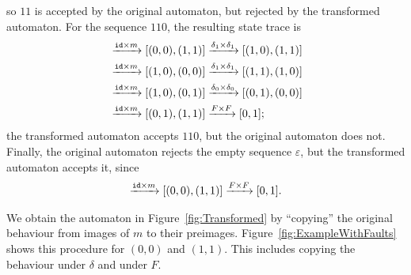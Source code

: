 so $11$ is accepted by the original automaton, but rejected by the transformed automaton. 
For the sequence $110$, the resulting state trace is 
\begin{align*}
    [(0,0),(0,0)]&\xrightarrow{\id\times m}[(0,0),(1,1)]\xrightarrow{\delta_1\times\delta_1}[(1,0),(1,1)]\\
   &\xrightarrow{\id\times m}[(1,0),(0,0)]\xrightarrow{\delta_1\times\delta_1}[(1,1),(1,0)]\\
   &\xrightarrow{\id\times m}[(1,0),(0,1)]\xrightarrow{\delta_0\times\delta_0}[(0,1),(0,0)]\\
   &\xrightarrow{\id\times m}[(0,1),(1,1)]\xrightarrow{F\times F}[0,1];
\end{align*}
the transformed automaton accepts $110$, but the original automaton does not. Finally, the original automaton rejects the empty sequence $\varepsilon$, but the transformed automaton accepts it, since 
\begin{align*}
    [(0,0),(0,0)]\xrightarrow{\id\times m}[(0,0),(1,1)]\xrightarrow{F\times F}[0,1].
\end{align*} 


We obtain the automaton in Figure~\ref{fig:Transformed} by ``copying'' the original behaviour from images of $m$ to their preimages. Figure~\ref{fig:ExampleWithFaults} shows this procedure for $(0,0)$ and $(1,1)$. This includes copying the behaviour under $\delta$ and under $F$. 

